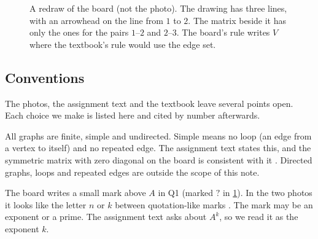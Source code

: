 \begin{figure}[ht]
\centering
{}
\caption{A redraw of the board (not the photo). The drawing has three lines, with
an arrowhead on the line from $1$ to $2$. The matrix beside it has only the
ones for the pairs $1$--$2$ and $2$--$3$. The board's rule writes $V$ where
the textbook's rule would use the edge set.}
\label{fig:boardredraw}
\end{figure}

\subsection{Conventions}

The photos, the assignment text and the textbook leave several points open.
Each choice we make is listed here and cited by number afterwards.

\begin{convention}\label{conv:graph}
All graphs are finite, simple and undirected. Simple means no loop (an edge from a
vertex to itself) and no repeated edge. The assignment text states this, and the
symmetric matrix with zero diagonal on the board is consistent with it
\cite{whiteboard1}. Directed graphs, loops and repeated edges are outside the
scope of this note.
\end{convention}

\begin{convention}\label{conv:power}
The board writes a small mark above $A$ in Q1 (marked $?$ in
\cref{fig:boardredraw}). In the two photos
it looks like the letter $n$ or $k$ between quotation-like marks
\cite{whiteboard1,whiteboard2}. The mark may be an exponent or a prime. The
assignment text asks about $A^k$, so we read it as the exponent $k$.
\end{convention}

